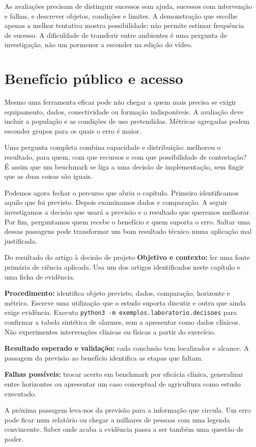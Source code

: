 As avaliações precisam de distinguir sucessos sem ajuda, sucessos com intervenção e falhas, e descrever objetos, condições e limites. A demonstração que escolhe apenas a melhor tentativa mostra possibilidade; não permite estimar frequência de sucesso. A dificuldade de transferir entre ambientes é uma pergunta de investigação, não um pormenor a esconder na edição do vídeo.

\section{Benefício público e acesso}
Mesmo uma ferramenta eficaz pode não chegar a quem mais precisa se exigir equipamento, dados, conectividade ou formação indisponíveis. A avaliação deve incluir a população e as condições de uso pretendidas. Métricas agregadas podem esconder grupos para os quais o erro é maior.

Uma pergunta completa combina capacidade e distribuição: melhorou o resultado, para quem, com que recursos e com que possibilidade de contestação? É assim que um benchmark se liga a uma decisão de implementação, sem fingir que as duas coisas são iguais.

Podemos agora fechar o percurso que abriu o capítulo. Primeiro identificamos aquilo que foi previsto. Depois examinamos dados e comparação. A seguir investigamos a decisão que usará a previsão e o resultado que queremos melhorar. Por fim, perguntamos quem recebe o benefício e quem suporta o erro. Saltar uma dessas passagens pode transformar um bom resultado técnico numa aplicação mal justificada.

\begin{promptlabbox}{Do resultado do artigo à decisão de projeto}
\textbf{Objetivo e contexto:} ler uma fonte primária de ciência aplicada. Usa um dos artigos identificados neste capítulo e uma ficha de evidência.

\textbf{Procedimento:} identifica objeto previsto, dados, comparação, horizonte e métrica. Escreve uma utilização que o estudo suporta discutir e outra que ainda exige evidência. Executa \texttt{python3 -m exemplos.laboratorio.decisoes} para confirmar a tabela sintética de alarmes, sem a apresentar como dados clínicos. Não experimentes intervenções clínicas ou físicas a partir do exercício.

\textbf{Resultado esperado e validação:} cada conclusão tem localizador e alcance. A passagem da previsão ao benefício identifica as etapas que faltam.

\textbf{Falhas possíveis:} trocar acerto em benchmark por eficácia clínica, generalizar entre horizontes ou apresentar um caso conceptual de agricultura como estudo executado.
\end{promptlabbox}

A próxima passagem leva-nos da previsão para a informação que circula. Um erro pode ficar num relatório ou chegar a milhares de pessoas com uma legenda convincente. Saber onde acaba a evidência passa a ser também uma questão de poder.
